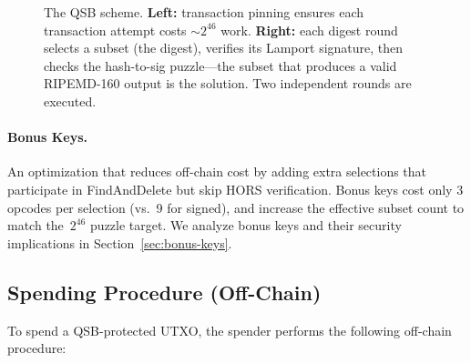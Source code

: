 \documentclass[11pt, a4paper]{article}
\begin{document}
\begin{figure}[H]
\caption{The QSB scheme. \textbf{Left:} transaction pinning ensures each transaction attempt costs ${\sim}2^{46}$ work. \textbf{Right:} each digest round selects a subset (the digest), verifies its Lamport signature, then checks the hash-to-sig puzzle---the subset that produces a valid RIPEMD-160 output is the solution. Two independent rounds are executed.}
\label{fig:qs-scheme}
\end{figure}

\paragraph{Bonus Keys.}
An optimization that reduces off-chain cost by adding extra selections that participate in FindAndDelete but skip HORS verification. Bonus keys cost only 3 opcodes per selection (vs.\ 9 for signed), and increase the effective subset count to match the~$2^{46}$ puzzle target. We analyze bonus keys and their security implications in Section~\ref{sec:bonus-keys}.

\subsection{Spending Procedure (Off-Chain)}
\label{sec:spending-procedure}

To spend a QSB-protected UTXO, the spender performs the following off-chain procedure:
\end{document}
